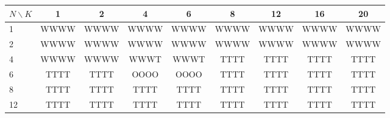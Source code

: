 \begin{tabular}{@{}lcccccccc@{}}\toprule
$N\backslash K$ & 1 & 2 & 4 & 6 & 8 & 12 & 16 & 20\\\midrule
1 & WWWW & WWWW & WWWW & WWWW & WWWW & WWWW & WWWW & WWWW\\
2 & WWWW & WWWW & WWWW & WWWW & WWWW & WWWW & WWWW & WWWW\\
4 & WWWW & WWWW & WWWT & WWWT & TTTT & TTTT & TTTT & TTTT\\
6 & TTTT & TTTT & OOOO & OOOO & TTTT & TTTT & TTTT & TTTT\\
8 & TTTT & TTTT & TTTT & TTTT & TTTT & TTTT & TTTT & TTTT\\
12 & TTTT & TTTT & TTTT & TTTT & TTTT & TTTT & TTTT & TTTT\\
\bottomrule\end{tabular}
\par{}

